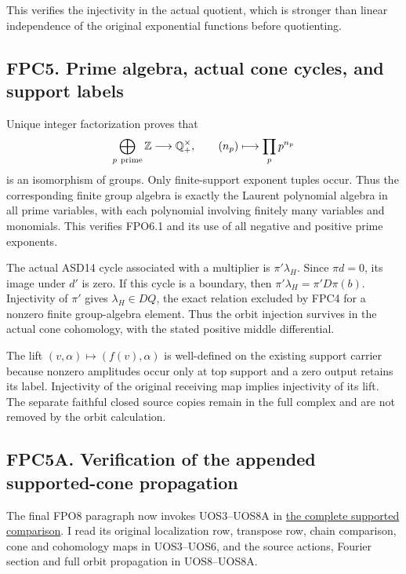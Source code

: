 This verifies the injectivity in the actual quotient, which is stronger
than linear independence of the original exponential functions before
quotienting.

\subsection{FPC5. Prime algebra, actual cone cycles, and support
labels}\label{fpc5.-prime-algebra-actual-cone-cycles-and-support-labels}

Unique integer factorization proves that \[
\bigoplus_{p\ {\rm prime}}\mathbb Z
\longrightarrow\mathbb Q_+^\times,\qquad
(n_p)\longmapsto\prod_p p^{n_p}
\] is an isomorphism of groups. Only finite-support exponent tuples
occur. Thus the corresponding finite group algebra is exactly the
Laurent polynomial algebra in all prime variables, with each polynomial
involving finitely many variables and monomials. This verifies FPO6.1
and its use of all negative and positive prime exponents.

The actual ASD14 cycle associated with a multiplier is
\(\pi'\lambda_H\). Since \(\pi d=0\), its image under \(d'\) is zero. If
this cycle is a boundary, then \(\pi'\lambda_H=\pi'D\pi(b)\).
Injectivity of \(\pi'\) gives \(\lambda_H\in DQ\), the exact relation
excluded by FPC4 for a nonzero finite group-algebra element. Thus the
orbit injection survives in the actual cone cohomology, with the stated
positive middle differential.

The lift \((v,\alpha)\mapsto(f(v),\alpha)\) is well-defined on the
existing support carrier because nonzero amplitudes occur only at top
support and a zero output retains its label. Injectivity of the original
receiving map implies injectivity of its lift. The separate faithful
closed source copies remain in the full complex and are not removed by
the orbit calculation.

\subsection{FPC5A. Verification of the appended supported-cone
propagation}\label{fpc5a.-verification-of-the-appended-supported-cone-propagation}

The final FPO8 paragraph now invokes UOS3--UOS8A in
\href{GLOBAL_UNIT_ORBIT_AND_SUPPORTED_COMPARISON.md}{the complete
supported comparison}. I read its original localization row, transpose
row, chain comparison, cone and cohomology maps in UOS3--UOS6, and the
source actions, Fourier section and full orbit propagation in
UOS8--UOS8A.

